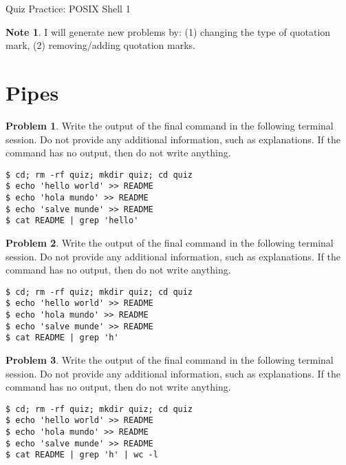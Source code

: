 \documentclass[10pt]{article}
\theoremstyle{definition}
\newtheorem{problem}{Problem}
\newtheorem{note}{Note}
\begin{document}
\begin{center}
{
\Large
Quiz Practice: POSIX Shell 1
}
\vspace{0.1in}
\end{center}

\begin{note}
    I will generate new problems by:
    (1) changing the type of quotation mark,
    (2) removing/adding quotation marks.
\end{note}

\section{Pipes}

\begin{samepage}
\begin{problem}
Write the output of the final command in the following terminal session.
Do not provide any additional information,
such as explanations.
If the command has no output,
then do not write anything.

\end{problem}
\begin{lstlisting}
$ cd; rm -rf quiz; mkdir quiz; cd quiz
$ echo 'hello world' >> README
$ echo 'hola mundo' >> README
$ echo 'salve munde' >> README
$ cat README | grep 'hello'
\end{lstlisting}
\end{samepage}


\begin{samepage}
\begin{problem}
Write the output of the final command in the following terminal session.
Do not provide any additional information,
such as explanations.
If the command has no output,
then do not write anything.

\end{problem}
\begin{lstlisting}
$ cd; rm -rf quiz; mkdir quiz; cd quiz
$ echo 'hello world' >> README
$ echo 'hola mundo' >> README
$ echo 'salve munde' >> README
$ cat README | grep 'h'
\end{lstlisting}
\end{samepage}


\begin{samepage}
\begin{problem}
Write the output of the final command in the following terminal session.
Do not provide any additional information,
such as explanations.
If the command has no output,
then do not write anything.

\end{problem}
\begin{lstlisting}
$ cd; rm -rf quiz; mkdir quiz; cd quiz
$ echo 'hello world' >> README
$ echo 'hola mundo' >> README
$ echo 'salve munde' >> README
$ cat README | grep 'h' | wc -l
\end{lstlisting}
\end{samepage}
\end{document}
